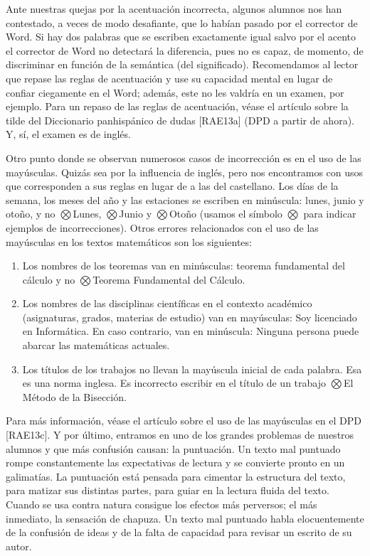 Ante nuestras quejas por la acentuación incorrecta, algunos alumnos nos han contestado, a veces de modo desafiante, que lo habían pasado por el corrector de Word.
Si hay dos palabras que se escriben exactamente igual salvo por el acento el corrector de Word no detectará la diferencia, pues no es capaz, de momento, de discriminar en función de la semántica (del significado).
Recomendamos al lector que repase las reglas de acentuación y use su capacidad mental en lugar de confiar ciegamente en el Word; además, este no les valdría en un examen, por ejemplo.
Para un repaso de las reglas de acentuación, véase el artículo sobre la tilde del Diccionario panhispánico de dudas [RAE13a] (DPD a partir de ahora).
Y, sí, el examen es de inglés.

Otro punto donde se observan numerosos casos de incorrección es en el uso de las mayúsculas.
Quizás sea por la influencia de inglés, pero nos encontramos con usos que corresponden a sus reglas en lugar de a las del castellano.
Los días de la semana, los meses del año y las estaciones se escriben en minúscula: lunes, junio y otoño, y no $\bigotimes$Lunes, $\bigotimes$Junio y $\bigotimes$Otoño (usamos el símbolo $\bigotimes$ para indicar ejemplos de incorrecciones).
Otros errores relacionados con el uso de las mayúsculas en los textos matemáticos son los siguientes:
\begin{enumerate}
    \item Los nombres de los teoremas van en minúsculas: teorema fundamental del cálculo y no $\bigotimes$Teorema Fundamental del Cálculo.
    \item Los nombres de las disciplinas científicas en el contexto académico (asignaturas, grados, materias de estudio) van en mayúsculas: Soy licenciado en Informática.
    En caso contrario, van en minúscula: Ninguna persona puede abarcar las matemáticas actuales.
    \item Los títulos de los trabajos no llevan la mayúscula inicial de cada palabra.
    Esa es una norma inglesa.
    Es incorrecto escribir en el título de un trabajo $\bigotimes$El Método de la Bisección.
\end{enumerate}


Para más información, véase el artículo sobre el uso de las mayúsculas en el DPD [RAE13c].
Y por último, entramos en uno de los grandes problemas de nuestros alumnos y que más confusión causan: la puntuación. Un texto mal puntuado rompe constantemente las expectativas de lectura y se convierte pronto en un galimatías. La puntuación está pensada para cimentar la estructura del texto, para matizar sus distintas partes, para guiar en la lectura fluida del texto. Cuando se usa contra natura consigue los efectos más perversos; el más inmediato, la sensación de chapuza. Un texto mal puntuado habla elocuentemente de la confusión de ideas y de la falta de capacidad para revisar un escrito de su autor.



